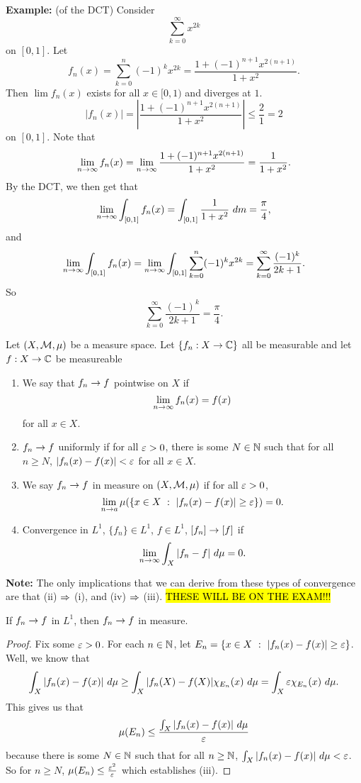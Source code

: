 \vs

\textbf{Example:} (of the DCT) Consider 
\[\sum_{k = 0}^\infty x^{2k}\]
on $[0,1]$. Let 
\[f_n(x) = \sum_{k = 0}^n (-1)^k x^{2k} = \frac{1 + (-1)^{n + 1}x^{2(n + 1)}}{1 + x^2}.\]
Then $\lim f_n(x)$ exists for all $x\in [0,1)$ and diverges at $1$.
\[|f_n(x)| = \left|\frac{1 + (-1)^{n + 1}x^{2(n + 1)}}{1 + x^2}\right|\leq \frac{2}{1} = 2\]
on $[0,1]$. Note that
\[\lim_{n\rightarrow \infty} f_n(x) = \lim_{n\rightarrow \infty} \frac{1 + (-1)^{n + 1}x^{2(n + 1)}}{1 + x^2} = \frac{1}{1 + x^2}.\]
By the DCT, we then get that
\[\lim_{n\rightarrow \infty} \int_{[0,1]}f_n(x) = \int_{[0,1]} \frac{1}{1 + x^2}\ dm = \frac{\pi}{4},\]
and
\[\lim_{n\rightarrow \infty} \int_{[0,1]}f_n(x) = \lim_{n\rightarrow \infty} \int_{[0,1]} \sum_{k = 0}^n (-1)^k x^{2k} = \sum_{k = 0}^\infty \frac{(-1)^k}{2k + 1}.\]
So 
\[\sum_{k = 0}^\infty \frac{(-1)^k}{2k + 1} = \frac{\pi}{4}.\]

\vs

\dfn Let $(X, \mathcal{M}, \mu)$ be a measure space. Let $\{f_n: X\rightarrow \mathbb{C}\}$ all be measurable and let $f:X\rightarrow \mathbb{C}$ be measureable
\begin{enumerate}[\hspace{1em}(i)]
    \item We say that $f_n\rightarrow f$ pointwise on $X$ if
    \[\lim_{n\rightarrow \infty} f_n(x) = f(x)\]
    for all $x\in X$.
    \item $f_n\rightarrow f$ uniformly if for all $\varepsilon > 0$, there is some $N\in \mathbb{N}$ such that for all $n\geq N$, $|f_n(x) - f(x)| < \varepsilon$ for all $x\in X$.
    \item We say $f_n\rightarrow f$ in measure on $(X, \mathcal{M}, \mu)$ if for all $\varepsilon > 0$,
    \[\lim_{n\rightarrow a} \mu(\{x\in X\ :\ |f_n(x) - f(x)| \geq \varepsilon\}) = 0.\]
    \item Convergence in $L^1$, $\{f_n\} \in L^1$, $f\in L^1$, $[f_n]\rightarrow [f]$ if 
    \[\lim_{n\rightarrow\infty}\int_X |f_n - f|\ d\mu = 0.\]
\end{enumerate}

\vs

\textbf{Note:} The only implications that we can derive from these types of convergence are that (ii) $\Rightarrow$ (i), and (iv) $\Rightarrow$ (iii). \hl{THESE WILL BE ON THE EXAM!!!}

\vs

\begin{prop}
If $f_n \rightarrow f$ in $L^1$, then $f_n\rightarrow f$ in measure.
\end{prop}

\begin{proof}
Fix some $\varepsilon > 0$. For each $n\in \mathbb{N}$, let $E_n = \{x\in X\ :\ |f_n(x) - f(x)| \geq \varepsilon\}$. Well, we know that 
\[\int_X|f_n(x) - f(x)|\ d\mu \geq \int_X |f_n(X) - f(X)|\chi_{E_n}(x)\ d\mu = \int_X \varepsilon \chi_{E_n}(x)\ d\mu.\]
This gives us that
\[\mu(E_n) \leq \frac{\int_X|f_n(x) - f(x)|\ d\mu}{\varepsilon}\]
because there is some $N\in \mathbb{N}$ such that for all $n\geq \mathbb{N}$, $\int_X |f_n(x) - f(x)|\ d\mu < \varepsilon$. So for $n\geq N$, $\mu(E_n) \leq \frac{\varepsilon^2}{\varepsilon}$ which establishes (iii).
\end{proof}

